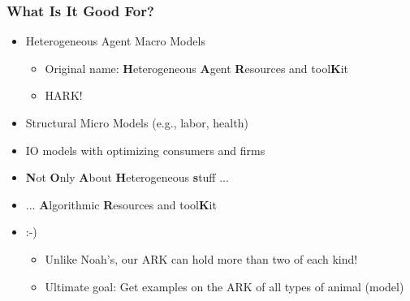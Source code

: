 \documentclass[public]{beamer}
\begin{document}
\begin{frame}
\frametitle{What Is It Good For?}

\begin{itemize}
\item Heterogeneous Agent Macro Models
\begin{itemize}
\item Original name: {\bf H}eterogeneous {\bf A}gent {\bf R}esources and tool{\bf K}it
\item HARK!
\end{itemize}
\item Structural Micro Models (e.g., labor, health)
\item IO models with optimizing consumers and firms
\item {\bf N}ot {\bf O}nly {\bf A}bout {\bf H}eterogeneous {\bf s}tuff ... 
\item ... {\bf A}lgorithmic {\bf R}esources and tool{\bf K}it 
\item :-)
\begin{itemize}
\item Unlike Noah's, our ARK can hold more than two of each kind!
\item Ultimate goal: Get examples on the ARK of all types of animal (model)
\end{itemize}
\end{itemize}


\end{frame}
\end{document}
